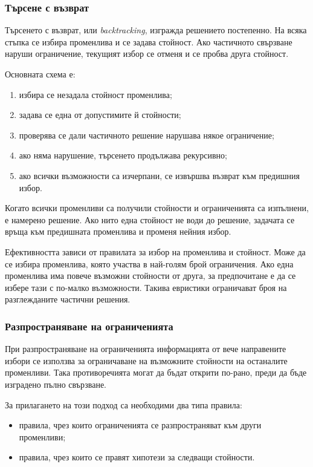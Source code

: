\subsubsection{Търсене с възврат}

Търсенето с възврат, или \emph{backtracking}, изгражда решението постепенно. На всяка стъпка се избира променлива и се задава стойност. Ако частичното свързване наруши ограничение, текущият избор се отменя и се пробва друга стойност.

Основната схема е:

\begin{enumerate}
\item избира се незадала стойност променлива;
\item задава се една от допустимите й стойности;
\item проверява се дали частичното решение нарушава някое ограничение;
\item ако няма нарушение, търсенето продължава рекурсивно;
\item ако всички възможности са изчерпани, се извършва възврат към предишния избор.
\end{enumerate}

Когато всички променливи са получили стойности и ограниченията са изпълнени, е намерено решение. Ако нито една стойност не води до решение, задачата се връща към предишната променлива и променя нейния избор.

Ефективността зависи от правилата за избор на променлива и стойност. Може да се избира променлива, която участва в най-голям брой ограничения. Ако една променлива има повече възможни стойности от друга, за предпочитане е да се избере тази с по-малко възможности. Такива евристики ограничават броя на разглежданите частични решения.

\subsubsection{Разпространяване на ограниченията}

При разпространяване на ограниченията информацията от вече направените избори се използва за ограничаване на възможните стойности на останалите променливи. Така противоречията могат да бъдат открити по-рано, преди да бъде изградено пълно свързване.

За прилагането на този подход са необходими два типа правила:

\begin{itemize}
\item правила, чрез които ограниченията се разпространяват към други променливи;
\item правила, чрез които се правят хипотези за следващи стойности.
\end{itemize}

